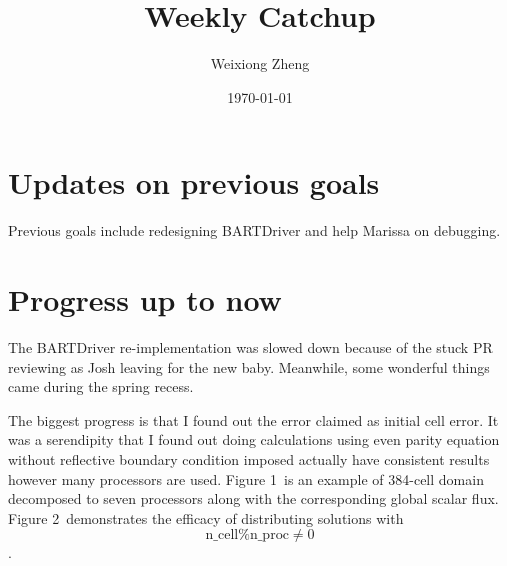 \documentclass{article}
\title{Weekly Catchup} %
\author{Weixiong Zheng} %
\date{\today} %
\begin{document}
\maketitle %

\section{Updates on previous goals}
Previous goals include redesigning BARTDriver and help Marissa on debugging.

\section{Progress up to now}
The BARTDriver re-implementation was slowed down because of the stuck PR reviewing as Josh
leaving for the new baby. Meanwhile, some wonderful things came during the spring recess.

The biggest progress is that I found out the error claimed as initial cell error. It was
a serendipity that I found out doing calculations using even parity equation without
reflective boundary condition imposed actually have consistent results however many processors are used. Figure 1\ is an example of 384-cell domain decomposed to seven processors along with the corresponding global scalar flux. Figure 2\ demonstrates the efficacy of distributing solutions with \[\mathrm{n\_cell}\%\mathrm{n\_proc}\neq0\].
\end{document}
